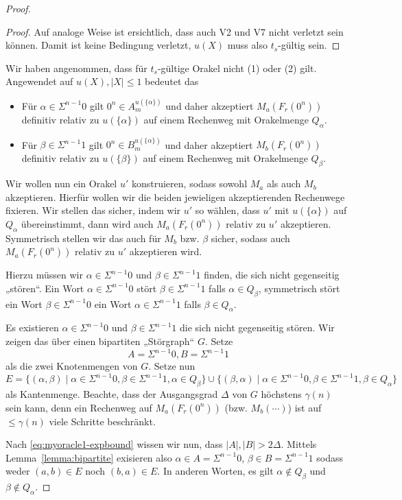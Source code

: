 \begin{proof}
\begin{proof}
    Auf analoge Weise ist ersichtlich, dass auch V2 und V7 nicht verletzt sein können.
    Damit ist keine Bedingung verletzt, $u(X)$ muss also $t_s$-gültig sein.
\end{proof}

Wir haben angenommen, dass für $t_{s}$-gültige Orakel nicht (1) oder (2) gilt. Angewendet auf $u(X), |X|\leq 1$ bedeutet das
\begin{itemize}[nosep]
    \item Für $\alpha\in \Sigma^{n-1}0$ gilt $0^n\in A_m^{u(\{\alpha\})}$ und daher akzeptiert $M_a(F_r(0^n))$ definitiv relativ zu $u(\{\alpha\})$ auf einem Rechenweg mit Orakelmenge $Q_\alpha$.
    \item Für $\beta\in \Sigma^{n-1}1$ gilt $0^n\in B_m^{u(\{\alpha\})}$ und daher akzeptiert $M_b(F_r(0^n))$ definitiv relativ zu $u(\{\beta\})$ auf einem Rechenweg mit Orakelmenge $Q_\beta$.
\end{itemize}
Wir wollen nun ein Orakel $u'$ konstruieren, sodass sowohl $M_a$ als auch $M_b$ akzeptieren.
Hierfür wollen wir die beiden jewieligen akzeptierenden Rechenwege fixieren.
Wir stellen das sicher, indem wir $u'$ so wählen, dass $u'$ mit $u(\{\alpha\})$ auf $Q_\alpha$ übereinstimmt, dann wird auch $M_a(F_r(0^n))$ relativ zu $u'$ akzeptieren.
Symmetrisch stellen wir das auch für $M_b$ bzw. $\beta$ sicher, sodass auch $M_a(F_r(0^n))$ relativ zu $u'$ akzeptieren wird.

Hierzu müssen wir $\alpha\in\Sigma^{n-1}0$ und $\beta\in\Sigma^{n-1}1$ finden, die sich nicht gegenseitig „stören“.
Ein Wort $\alpha\in\Sigma^{n-1}0$ stört $\beta\in\Sigma^{n-1}1$ falls $\alpha\in Q_\beta$, 
symmetrisch stört ein Wort $\beta\in\Sigma^{n-1}0$ ein Wort  $\alpha\in\Sigma^{n-1}1$ falls $\beta\in Q_\alpha$.

Es existieren $\alpha\in\Sigma^{n-1}0$ und $\beta\in\Sigma^{n-1}1$ die sich nicht gegenseitig stören. Wir zeigen das über einen bipartiten „Störgraph“ $G$.
Setze 
\[ A=\Sigma^{n-1}0, B=\Sigma^{n-1}1 \]
als die zwei Knotenmengen von $G$.
Setze nun
\[ E = \{ (\alpha, \beta) \mid \alpha\in\Sigma^{n-1}0, \beta\in\Sigma^{n-1}1, \alpha\in Q_\beta\} \cup \{ (\beta, \alpha) \mid \alpha\in\Sigma^{n-1}0, \beta\in\Sigma^{n-1}1, \beta\in Q_\alpha\} \]
als Kantenmenge.
Beachte, dass der Ausgangsgrad $\Delta$ von $G$ höchstens $\gamma(n)$ sein kann, denn ein Rechenweg auf $M_a(F_r(0^n))$ (bzw. $M_b(\cdots)$) ist auf $\leq \gamma(n)$ viele Schritte beschränkt.

Nach \eqref{eq:myoracle1-expbound} wissen wir nun, dass $|A|, |B|>2\Delta$. Mittels Lemma~\ref{lemma:bipartite} exisieren also $\alpha\in A = \Sigma^{n-1}0$, $\beta\in B=\Sigma^{n-1}1$ sodass weder $(a,b)\in E$ noch $(b,a)\in E$.
In anderen Worten, es gilt $\alpha\not\in Q_\beta$ und $\beta\not\in Q_\alpha$.


\end{proof}
